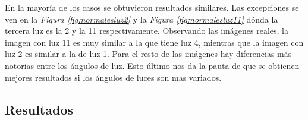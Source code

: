En la mayoría de los casos se obtuvieron resultados similares. Las excepciones se ven en la \textit{Figura \ref{fig:normalesluz2}} y la \textit{Figura \ref{fig:normalesluz11}} dónda la tercera luz es la 2 y la 11 respectivamente. Observando las imágenes reales, la imagen con luz 11 es muy similar a la que tiene luz 4, mientras que la imagen con luz 2 es similar a la de luz 1. Para el resto de las imágenes hay diferencias más notorias entre los ángulos de luz. Esto último nos da la pauta de que se obtienen mejores resultados si los ángulos de luces son mas variados.

\newpage
\subsection{Resultados}





